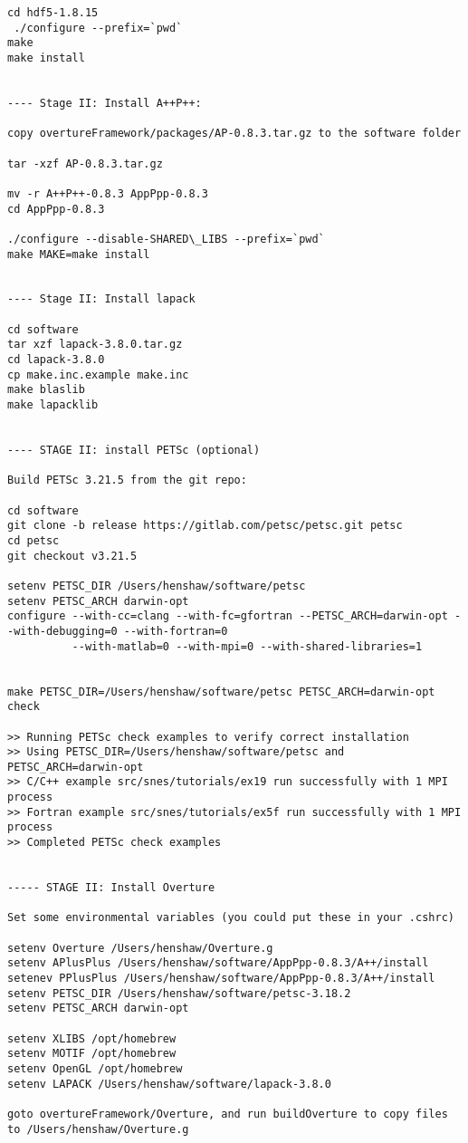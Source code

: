 \begin{Verbatim}[fontsize=\footnotesize]
cd hdf5-1.8.15
 ./configure --prefix=`pwd` 
make
make install


---- Stage II: Install A++P++:

copy overtureFramework/packages/AP-0.8.3.tar.gz to the software folder

tar -xzf AP-0.8.3.tar.gz

mv -r A++P++-0.8.3 AppPpp-0.8.3
cd AppPpp-0.8.3

./configure --disable-SHARED\_LIBS --prefix=`pwd`  
make MAKE=make install


---- Stage II: Install lapack

cd software
tar xzf lapack-3.8.0.tar.gz
cd lapack-3.8.0
cp make.inc.example make.inc
make blaslib
make lapacklib


---- STAGE II: install PETSc (optional)

Build PETSc 3.21.5 from the git repo: 

cd software
git clone -b release https://gitlab.com/petsc/petsc.git petsc
cd petsc
git checkout v3.21.5

setenv PETSC_DIR /Users/henshaw/software/petsc
setenv PETSC_ARCH darwin-opt
configure --with-cc=clang --with-fc=gfortran --PETSC_ARCH=darwin-opt --with-debugging=0 --with-fortran=0 
          --with-matlab=0 --with-mpi=0 --with-shared-libraries=1


make PETSC_DIR=/Users/henshaw/software/petsc PETSC_ARCH=darwin-opt check

>> Running PETSc check examples to verify correct installation
>> Using PETSC_DIR=/Users/henshaw/software/petsc and PETSC_ARCH=darwin-opt
>> C/C++ example src/snes/tutorials/ex19 run successfully with 1 MPI process
>> Fortran example src/snes/tutorials/ex5f run successfully with 1 MPI process
>> Completed PETSc check examples


----- STAGE II: Install Overture

Set some environmental variables (you could put these in your .cshrc)

setenv Overture /Users/henshaw/Overture.g
setenv APlusPlus /Users/henshaw/software/AppPpp-0.8.3/A++/install
setenev PPlusPlus /Users/henshaw/software/AppPpp-0.8.3/A++/install
setenv PETSC_DIR /Users/henshaw/software/petsc-3.18.2
setenv PETSC_ARCH darwin-opt

setenv XLIBS /opt/homebrew
setenv MOTIF /opt/homebrew
setenv OpenGL /opt/homebrew
setenv LAPACK /Users/henshaw/software/lapack-3.8.0

goto overtureFramework/Overture, and run buildOverture to copy files to /Users/henshaw/Overture.g


\end{Verbatim}
